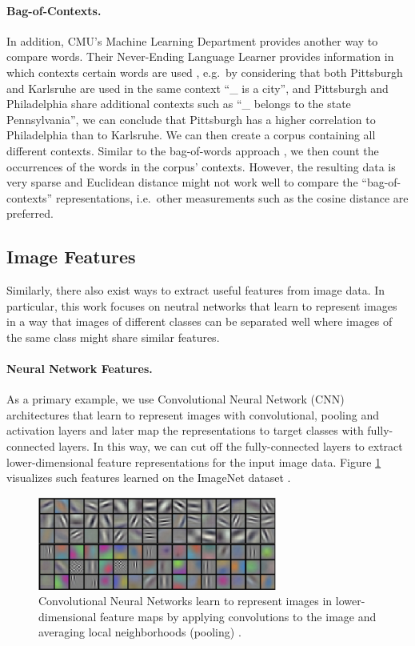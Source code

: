 \paragraph{Bag-of-Contexts.} In addition, CMU's Machine Learning Department provides another way to compare words. Their Never-Ending Language Learner provides information in which contexts certain words are used \cite{nell_pairs}, e.g.\ by considering that both Pittsburgh and Karlsruhe are used in the same context ``\_ is a city'', and Pittsburgh and Philadelphia share additional contexts such as ``\_ belongs to the state Pennsylvania'', we can conclude that Pittsburgh has a higher correlation to Philadelphia than to Karlsruhe. We can then create a corpus containing all different contexts. Similar to the bag-of-words approach \cite{bow}, we then count the occurrences of the words in the corpus' contexts. However, the resulting data is very sparse and Euclidean distance might not work well to compare the ``bag-of-contexts'' representations, i.e.\ other measurements such as the cosine distance are preferred.

\subsection{Image Features}
\label{sec:imagefeatures}

Similarly, there also exist ways to extract useful features from image data. In particular, this work focuses on neutral networks that learn to represent images in a way that images of different classes can be separated well where images of the same class might share similar features. 

\paragraph{Neural Network Features.} As a primary example, we use Convolutional Neural Network (CNN) architectures that learn to represent images with convolutional, pooling and activation layers and later map the representations to target classes with fully-connected layers. In this way, we can cut off the fully-connected layers to extract lower-dimensional feature representations for the input image data. Figure \ref{fig:cnnfeatures} visualizes such features learned on the ImageNet dataset \cite{krizhevsky2012imagenet}.

\begin{figure}[h]
    \centering
    \includegraphics[width=0.7\textwidth]{images/cnn_features}
    \caption{Convolutional Neural Networks learn to represent images in lower-dimensional feature maps by applying convolutions to the image and averaging local neighborhoods (pooling) \cite{krizhevsky2012imagenet}.}
    \label{fig:cnnfeatures}
\end{figure}

